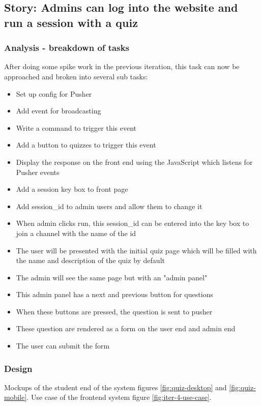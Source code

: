 \subsection{Story: Admins can log into the website and run a session with a quiz}
\subsubsection{Analysis - breakdown of tasks}
After doing some spike work in the previous iteration, this task can now be approached and broken into several sub tasks:
\begin{itemize}
	\item Set up config for Pusher
	\item Add event for broadcasting
	\item Write a command to trigger this event
	\item Add a button to quizzes to trigger this event
	\item Display the response on the front end using the JavaScript which listens for Pusher events
	\item Add a session key box to front page
	\item Add session\_id to admin users and allow them to change it
	\item When admin clicks run, this session\_id can be entered into the key box to join a channel with the name of the id
	\item The user will be presented with the initial quiz page which will be filled with the name and description of the quiz by default
	\item The admin will see the same page but with an "admin panel"
	\item This admin panel has a next and previous button for questions
	\item When these buttons are pressed, the question is sent to pusher
	\item These question are rendered as a form on the user end and admin end
	\item The user can submit the form
\end{itemize}
\subsubsection{Design}
Mockups of the student end of the system figures \ref{fig:quiz-desktop} and \ref{fig:quiz-mobile}. Use case of the frontend system figure \ref{fig:iter-4-use-case}.

